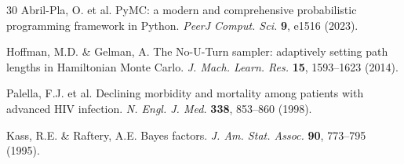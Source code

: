 \documentclass[10pt,a4paper]{article}
\begin{document}
\begin{thebibliography}{30}
Abril-Pla, O. et al. PyMC: a modern and comprehensive probabilistic programming framework in Python. \textit{PeerJ Comput. Sci.} \textbf{9}, e1516 (2023).

Hoffman, M.D. \& Gelman, A. The No-U-Turn sampler: adaptively setting path lengths in Hamiltonian Monte Carlo. \textit{J. Mach. Learn. Res.} \textbf{15}, 1593--1623 (2014).

Palella, F.J. et al. Declining morbidity and mortality among patients with advanced HIV infection. \textit{N. Engl. J. Med.} \textbf{338}, 853--860 (1998).

Kass, R.E. \& Raftery, A.E. Bayes factors. \textit{J. Am. Stat. Assoc.} \textbf{90}, 773--795 (1995).

\end{thebibliography}
\end{document}
